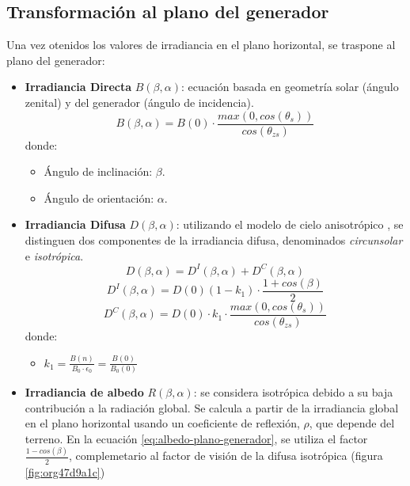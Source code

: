 \subsection{Transformación al plano del generador}
\label{sec:org8883020}
\label{subsec:transformación-plano-generador}
Una vez otenidos los valores de irradiancia en el plano horizontal, se traspone al plano del generador:
\begin{itemize}
\item \textbf{Irradiancia Directa} \(B(\beta ,\alpha)\): ecuación basada en geometría solar (ángulo zenital) y del generador (ángulo de incidencia).
\begin{equation}
B(\beta ,\alpha)=B(0)\cdot \frac{max(0,cos(\theta_s))}{cos(\theta_{zs})}
\label{eq:irradiancia-directa-plano-generador}
\end{equation}
donde:
\begin{itemize}
\item Ángulo de inclinación: \(\beta\).
\item Ángulo de orientación: \(\alpha\). 
\end{itemize}
\item \textbf{Irradiancia Difusa} \(D(\beta ,\alpha)\): utilizando el modelo de cielo anisotrópico \cite{Perpinan2023}, se distinguen dos componentes de la irradiancia difusa, denominados \emph{circunsolar} e \emph{isotrópica}.  
\begin{equation}
D(\beta ,\alpha)=D^I(\beta ,\alpha)+D^C(\beta ,\alpha)
\end{equation}
\begin{equation}
D^I(\beta ,\alpha)=D(0)(1-k_1)\cdot \frac{1+cos(\beta)}{2}
\end{equation}
\begin{equation}
D^C(\beta, \alpha)=D(0)\cdot k_1\cdot \frac{max(0,cos(\theta_s))}{cos(\theta_{zs})}
\end{equation}
donde:
\begin{itemize}
\item \(k_1=\frac{B(n)}{B_0\cdot \epsilon_0}=\frac{B(0)}{B_0(0)}\)
\end{itemize}
\item \textbf{Irradiancia de albedo} \(R(\beta ,\alpha)\): se considera isotrópica debido a su baja contribución a la radiación global. Se calcula a partir de la irradiancia global en el plano horizontal usando un coeficiente de reflexión, \(\rho\), que depende del terreno. En la ecuación \ref{eq:albedo-plano-generador}, se utiliza el factor \(\frac{1-cos(\beta)}{2}\), complemetario al factor de visión de la difusa isotrópica (figura \ref{fig:org47d9a1c})

\end{itemize}
